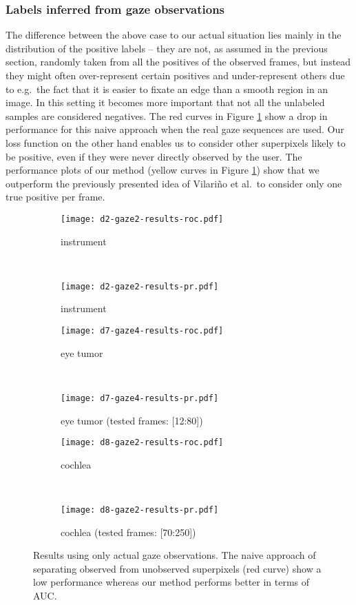 \subsubsection*{Labels inferred from gaze observations}
The difference between the above case to our actual situation lies mainly in the distribution of the positive labels -- they are not, as assumed in the previous section, randomly taken from all the positives of the observed frames, but instead they might often over-represent certain positives and under-represent others due to e.g.\ the fact that it is easier to fixate an edge than a smooth region in an image. 
In this setting it becomes more important that not all the unlabeled samples are considered negatives. 
The red curves in Figure \ref{fig:results-curves} show a drop in performance for this naive approach when the real gaze sequences are used. 
Our loss function on the other hand enables us to consider other superpixels likely to be positive, even if they were never directly observed by the user. 
The performance plots of our method (yellow curves in Figure \ref{fig:results-curves}) show that we outperform the previously presented idea of Vilari\~no et al.\ to consider only one true positive per frame.

\begin{figure}[ht]
	\centering
	\begin{subfigure}[h]{0.45\textwidth}
	\texttt{[image: d2-gaze2-results-roc.pdf]}	
		\caption*{instrument}
	\end{subfigure}
	~
	\begin{subfigure}[h]{0.45\textwidth}
	\texttt{[image: d2-gaze2-results-pr.pdf]}	
		\caption*{instrument}
	\end{subfigure}
	
	\vspace{3mm}
	\begin{subfigure}[h]{0.45\textwidth}
	\texttt{[image: d7-gaze4-results-roc.pdf]}	
		\caption*{eye tumor}
	\end{subfigure}
	~
	\begin{subfigure}[h]{0.45\textwidth}
	\texttt{[image: d7-gaze4-results-pr.pdf]}	
		\caption*{eye tumor (tested frames: [12:80])}
	\end{subfigure}	
	
	\vspace{3mm}
	\begin{subfigure}[h]{0.45\textwidth}
	\texttt{[image: d8-gaze2-results-roc.pdf]}	
		\caption*{cochlea}
	\end{subfigure}
	~
	\begin{subfigure}[h]{0.45\textwidth}
	\texttt{[image: d8-gaze2-results-pr.pdf]}	
		\caption*{cochlea (tested frames: [70:250])}
	\end{subfigure}		
	\caption{Results using only actual gaze observations. The naive approach of separating observed from unobserved superpixels (red curve) show a low performance whereas our method performs better in terms of AUC.}
	\label{fig:results-curves}
\end{figure}

